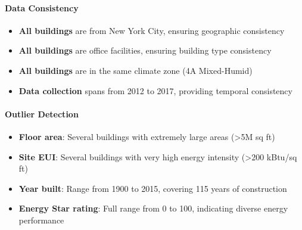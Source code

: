 \paragraph{Data Consistency}
\begin{itemize}
    \item \textbf{All buildings} are from New York City, ensuring geographic consistency
    \item \textbf{All buildings} are office facilities, ensuring building type consistency
    \item \textbf{All buildings} are in the same climate zone (4A Mixed-Humid)
    \item \textbf{Data collection} spans from 2012 to 2017, providing temporal consistency
\end{itemize}

\paragraph{Outlier Detection}
\begin{itemize}
    \item \textbf{Floor area}: Several buildings with extremely large areas (>5M sq ft)
    \item \textbf{Site EUI}: Several buildings with very high energy intensity (>200 kBtu/sq ft)
    \item \textbf{Year built}: Range from 1900 to 2015, covering 115 years of construction
    \item \textbf{Energy Star rating}: Full range from 0 to 100, indicating diverse energy performance
\end{itemize} 